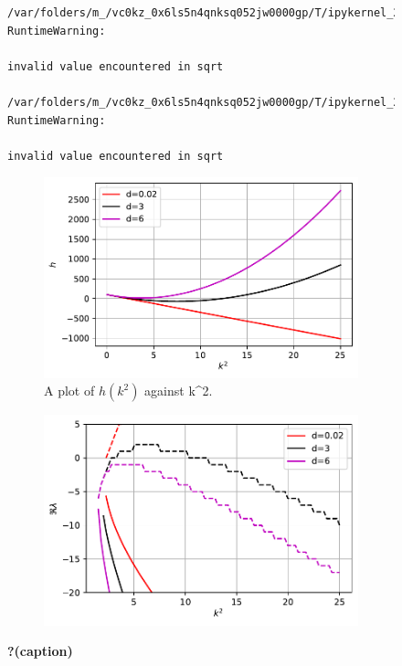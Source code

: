 \documentclass[
  letterpaper,
  DIV=11,
  numbers=noendperiod]{scrreprt}
\theoremstyle{plain}
\theoremstyle{definition}
\theoremstyle{plain}
\theoremstyle{remark}
\begin{document}
\begin{figure}
{\begin{verbatim}
/var/folders/m_/vc0kz_0x6ls5n4qnksq052jw0000gp/T/ipykernel_21556/2851046048.py:30: RuntimeWarning:

invalid value encountered in sqrt

/var/folders/m_/vc0kz_0x6ls5n4qnksq052jw0000gp/T/ipykernel_21556/2851046048.py:31: RuntimeWarning:

invalid value encountered in sqrt
\end{verbatim}

\begin{figure}[H]

{\centering \includegraphics{DiffusionDrivenInstability_files/figure-pdf/fig-dispersion-output-3.pdf}

}

\caption{A plot of \(h(k^2)\) against k\^{}2.}

\end{figure}

\begin{figure}[H]

{\centering \includegraphics{DiffusionDrivenInstability_files/figure-pdf/fig-dispersion-output-4.pdf}

}

\end{figure}

}

\caption{\label{fig-dispersion}\textbf{?(caption)}}

\end{figure}
\end{document}
